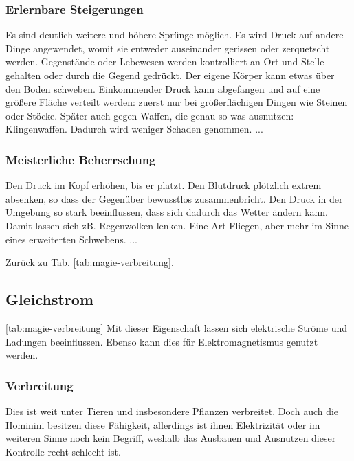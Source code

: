 \subsubsection{Erlernbare Steigerungen}
\begin{outline}
	\1 Es sind deutlich weitere und höhere Sprünge möglich.
	\1 Es wird Druck auf andere Dinge angewendet, womit sie entweder auseinander gerissen oder zerquetscht werden.
	\1 Gegenstände oder Lebewesen werden kontrolliert an Ort und Stelle gehalten oder durch die Gegend gedrückt.
	\1 Der eigene Körper kann etwas über den Boden schweben.
	\1 Einkommender Druck kann abgefangen und auf eine größere Fläche verteilt werden: zuerst nur bei größerflächigen Dingen wie Steinen oder Stöcke. 
	Später auch gegen Waffen, die genau so was ausnutzen: Klingenwaffen. 
	Dadurch wird weniger Schaden genommen.
	\1 ...
\end{outline}

\subsubsection{Meisterliche Beherrschung} 
\begin{outline}
	\1 Den Druck im Kopf erhöhen, bis er platzt.
	\1 Den Blutdruck plötzlich extrem absenken, so dass der Gegenüber bewusstlos zusammenbricht. 
	\1 Den Druck in der Umgebung so stark beeinflussen, dass sich dadurch das Wetter ändern kann. Damit lassen sich zB. Regenwolken lenken. 
	\1 Eine Art Fliegen, aber mehr im Sinne eines erweiterten Schwebens.
	\1 ...
\end{outline}
Zurück zu Tab. \ref{tab:magie-verbreitung}.



\subsection{Gleichstrom}\label{sec:gleichstrommagie} \ref{tab:magie-verbreitung} %
Mit dieser Eigenschaft lassen sich elektrische Ströme und Ladungen beeinflussen. Ebenso kann dies für Elektromagnetismus genutzt werden.

\subsubsection{Verbreitung}
Dies ist weit unter Tieren und insbesondere Pflanzen verbreitet. Doch auch die Hominini besitzen diese Fähigkeit, allerdings ist ihnen Elektrizität oder im weiteren Sinne noch kein Begriff, weshalb das Ausbauen und Ausnutzen dieser Kontrolle recht schlecht ist.

